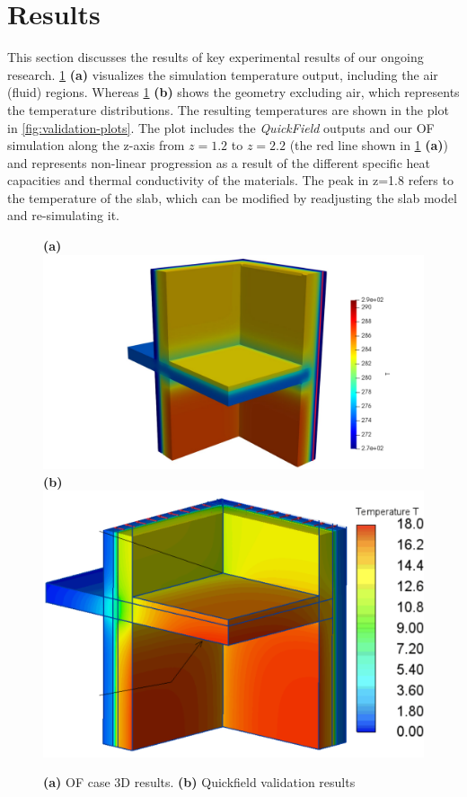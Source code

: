 \afterpage{\clearpage}
\section{Results}

This section discusses the results of key experimental results of our ongoing research. 
\cref{paraview} \textbf{(a)} visualizes the simulation temperature output, including the air (fluid) regions. Whereas
\cref{paraview} \textbf{(b)} shows the geometry excluding air, which represents the temperature distributions. The resulting temperatures are shown in the plot in \cref{fig:validation-plots}. The plot includes the \textit{QuickField} outputs and our  \gls{OF} simulation along the z-axis from $z= 1.2$ to $z=2.2$ (the red line shown in \cref{paraview} \textbf{(a)}) and represents non-linear progression as a result of the different specific heat capacities and thermal conductivity of the materials. The peak in z=1.8 refers to the temperature of the slab, which can be modified by readjusting the slab model and re-simulating it. 



\begin{figure}[htb]
    \centering
    \textbf{(a)}\includegraphics[trim=5cm 0cm 4.5cm 0cm, clip, width=0.70\linewidth]{Figures/newvalleg.pdf}
    \textbf{(b)}\includegraphics[width=0.65\columnwidth]{Figures/ValidationCaseClean.png}
\hspace{0.7cm}
    \caption[3D Validation Visualization]{\textbf{(a)} \gls{OF} case 3D results. \textbf{(b)} Quickfield validation results}
    \label{paraview}
\end{figure}




